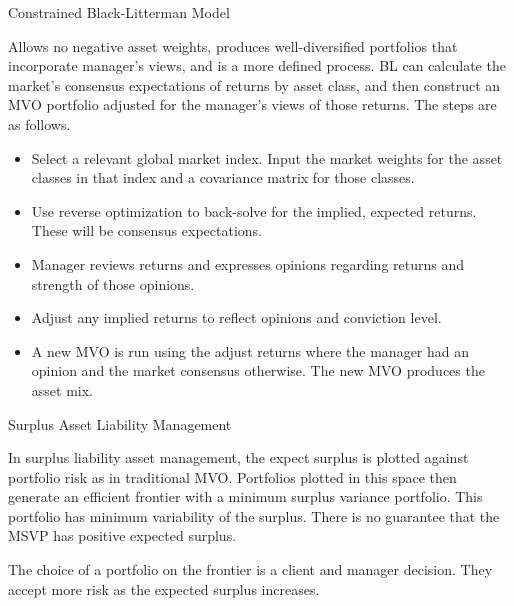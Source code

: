 \documentclass[../custom]{flashcards}
\newcommand{\studyArea}{Asset Allocation}
\begin{document}
\begin{flashcard}[\studyArea]{Constrained Black-Litterman Model}
    \begin{flushleft}
        Allows no negative asset weights, produces well-diversified portfolios that incorporate manager's views, and is a more defined process. BL can calculate the market's consensus expectations of returns by asset class, and then construct an MVO portfolio adjusted for the manager's views of those returns. The steps are as follows.
        
        \begin{itemize}
            \item Select a relevant global market index. Input the market weights for the asset classes in that index and a covariance matrix for those classes.
            \item Use reverse optimization to back-solve for the implied, expected returns. These will be consensus expectations.
            \item Manager reviews returns and expresses opinions regarding returns and strength of those opinions.
            \item Adjust any implied returns to reflect opinions and conviction level.
            \item A new MVO is run using the adjust returns where the manager had an opinion and the market consensus otherwise. The new MVO produces the asset mix.
        \end{itemize}
    \end{flushleft}
\end{flashcard}

\begin{flashcard}[\studyArea]{Surplus Asset Liability Management}
    \begin{flushleft}
        In surplus liability asset management, the expect surplus is plotted against portfolio risk as in traditional MVO\@. Portfolios plotted in this space then generate an efficient frontier with a minimum surplus variance portfolio. This portfolio has minimum variability of the surplus. There is no guarantee that the MSVP has positive expected surplus.\newline

        The choice of a portfolio on the frontier is a client and manager decision. They accept more risk as the expected surplus increases.
    \end{flushleft}
\end{flashcard}
\end{document}
